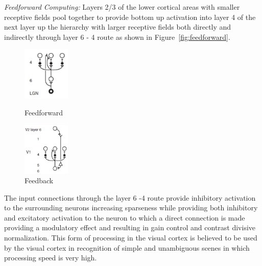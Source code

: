 \documentclass[12pt,twoside]{article}
\theoremstyle{plain}
\theoremstyle{definition}
\theoremstyle{remark}
\begin{document}
\textit{Feedforward Computing: }Layers 2/3 of the lower cortical areas with smaller receptive fields pool together to provide bottom up activation into layer 4 of the next layer up the hierarchy with larger receptive fields both directly and indirectly through layer 6 - 4 route as shown in Figure~\ref{fig:feedforward}. \begin{figure} 
	\begin{centering}
		\includegraphics[width=0.2\textwidth]{feedforward}
	\end{centering}
  \caption{Feedforward}
  \label{fig:feedforward}
  \begin{centering}
		\includegraphics[width=0.2\textwidth]{feedback}
	\end{centering}
  \caption{Feedback}
  \label{fig:feedback}
\end{figure}The input connections through the layer 6 -4 route provide inhibitory activation to the surrounding neurons increasing sparseness while providing both inhibitory and excitatory activation to the neuron to which a direct connection is made providing a modulatory effect and resulting in  gain control and contrast divisive normalization. This form of processing in the visual cortex is believed to be used by the visual cortex in recognition of simple and unambiguous scenes in which processing speed is very high\cite{SimonThorpe1996}.\\ 
\end{document}
